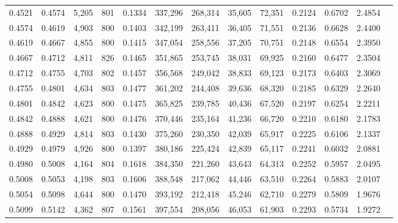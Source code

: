 \begin{tabular}{rrrrrrrrrrrrr}
0.4521 & 0.4574 &  5,205 &   801 &                                     0.1334 & 337,296 & 268,314 &  35,605 &  72,351 & 0.2124 & 0.6702 & 2.4854 \\
0.4574 & 0.4619 &  4,903 &   800 &                                     0.1403 & 342,199 & 263,411 &  36,405 &  71,551 & 0.2136 & 0.6628 & 2.4400 \\
0.4619 & 0.4667 &  4,855 &   800 &                                     0.1415 & 347,054 & 258,556 &  37,205 &  70,751 & 0.2148 & 0.6554 & 2.3950 \\
0.4667 & 0.4712 &  4,811 &   826 &                                     0.1465 & 351,865 & 253,745 &  38,031 &  69,925 & 0.2160 & 0.6477 & 2.3504 \\
0.4712 & 0.4755 &  4,703 &   802 &                                     0.1457 & 356,568 & 249,042 &  38,833 &  69,123 & 0.2173 & 0.6403 & 2.3069 \\
0.4755 & 0.4801 &  4,634 &   803 &                                     0.1477 & 361,202 & 244,408 &  39,636 &  68,320 & 0.2185 & 0.6329 & 2.2640 \\
0.4801 & 0.4842 &  4,623 &   800 &                                     0.1475 & 365,825 & 239,785 &  40,436 &  67,520 & 0.2197 & 0.6254 & 2.2211 \\
0.4842 & 0.4888 &  4,621 &   800 &                                     0.1476 & 370,446 & 235,164 &  41,236 &  66,720 & 0.2210 & 0.6180 & 2.1783 \\
0.4888 & 0.4929 &  4,814 &   803 &                                     0.1430 & 375,260 & 230,350 &  42,039 &  65,917 & 0.2225 & 0.6106 & 2.1337 \\
0.4929 & 0.4979 &  4,926 &   800 &                                     0.1397 & 380,186 & 225,424 &  42,839 &  65,117 & 0.2241 & 0.6032 & 2.0881 \\
0.4980 & 0.5008 &  4,164 &   804 &                                     0.1618 & 384,350 & 221,260 &  43,643 &  64,313 & 0.2252 & 0.5957 & 2.0495 \\
0.5008 & 0.5053 &  4,198 &   803 &                                     0.1606 & 388,548 & 217,062 &  44,446 &  63,510 & 0.2264 & 0.5883 & 2.0107 \\
0.5054 & 0.5098 &  4,644 &   800 &                                     0.1470 & 393,192 & 212,418 &  45,246 &  62,710 & 0.2279 & 0.5809 & 1.9676 \\
0.5099 & 0.5142 &  4,362 &   807 &                                     0.1561 & 397,554 & 208,056 &  46,053 &  61,903 & 0.2293 & 0.5734 & 1.9272 \\

\end{tabular}
